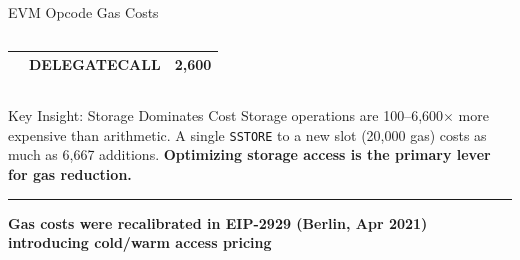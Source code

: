 \documentclass[8pt,aspectratio=169]{beamer}
\newcommand{\bottomnote}[1]{\vfill\vspace{-2mm}\textcolor{mllavender2}{\rule{\textwidth}{0.4pt}}\vspace{1mm}\footnotesize\textbf{#1}}
\begin{document}
\begin{frame}{EVM Opcode Gas Costs}
\begin{columns}
\begin{center}
\begin{tabular}{@{}llr@{}}
& DELEGATECALL & 2,600 \\
\bottomrule
\end{tabular}
\end{center}
\end{columns}
\vspace{2mm}
\begin{alertblock}{Key Insight: Storage Dominates Cost}
\small Storage operations are 100--6,600$\times$ more expensive than arithmetic. A single \texttt{SSTORE} to a new slot (20,000 gas) costs as much as 6,667 additions. \textbf{Optimizing storage access is the primary lever for gas reduction.}
\end{alertblock}
\bottomnote{Gas costs were recalibrated in EIP-2929 (Berlin, Apr 2021) introducing cold/warm access pricing}
\end{frame}
\end{document}
